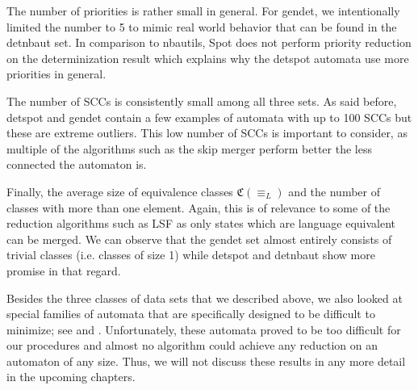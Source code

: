 The number of priorities is rather small in general. For \textsf{gendet}, we intentionally limited the number to 5 to mimic real world behavior that can be found in the \textsf{detnbaut} set. In comparison to nbautils, Spot does not perform priority reduction on the determinization result which explains why the \textsf{detspot} automata use more priorities in general. 

The number of SCCs is consistently small among all three sets. As said before, \textsf{detspot} and \textsf{gendet} contain a few examples of automata with up to 100 SCCs but these are extreme outliers. This low number of SCCs is important to consider, as multiple of the algorithms such as the skip merger perform better the less connected the automaton is.

Finally, the average size of equivalence classes $\mathfrak{C}(\equiv_L)$ and the number of classes with more than one element. Again, this is of relevance to some of the reduction algorithms such as LSF as only states which are language equivalent can be merged. We can observe that the \textsf{gendet} set almost entirely consists of trivial classes (i.e. classes of size 1) while \textsf{detspot} and \textsf{detnbaut} show more promise in that regard.

\vspace{5pt}

Besides the three classes of data sets that we described above, we also looked at special families of automata that are specifically designed to be difficult to minimize; see \cite{Michel1988} and \cite{Thomas1997}. Unfortunately, these automata proved to be too difficult for our procedures and almost no algorithm could achieve any reduction on an automaton of any size. Thus, we will not discuss these results in any more detail in the upcoming chapters.

